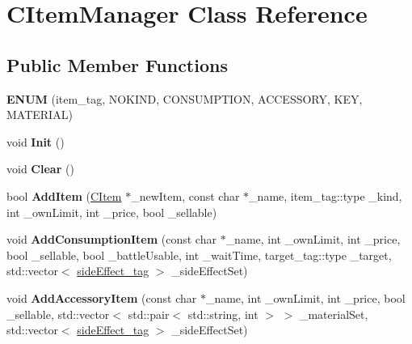 \hypertarget{class_c_item_manager}{}\section{C\+Item\+Manager Class Reference}
\label{class_c_item_manager}
\subsection*{Public Member Functions}
\begin{DoxyCompactItemize}
\item 
{\bfseries E\+N\+UM} (item\+\_\+tag, N\+O\+K\+I\+ND, C\+O\+N\+S\+U\+M\+P\+T\+I\+ON, A\+C\+C\+E\+S\+S\+O\+RY, K\+EY, M\+A\+T\+E\+R\+I\+AL)\hypertarget{class_c_item_manager_a5e95186104368015b674093bf9a4735a}{}\label{class_c_item_manager_a5e95186104368015b674093bf9a4735a}

\item 
void {\bfseries Init} ()\hypertarget{class_c_item_manager_a782a0f695d950a98f18d3e14ec1ac840}{}\label{class_c_item_manager_a782a0f695d950a98f18d3e14ec1ac840}

\item 
void {\bfseries Clear} ()\hypertarget{class_c_item_manager_aa20f0ea8d83f0c37395f2897b5b6a97f}{}\label{class_c_item_manager_aa20f0ea8d83f0c37395f2897b5b6a97f}

\item 
bool {\bfseries Add\+Item} (\hyperlink{class_c_item}{C\+Item} $\ast$\+\_\+new\+Item, const char $\ast$\+\_\+name, item\+\_\+tag\+::type \+\_\+kind, int \+\_\+own\+Limit, int \+\_\+price, bool \+\_\+sellable)\hypertarget{class_c_item_manager_ab09e43b1d2118f1f54a00307829df1e6}{}\label{class_c_item_manager_ab09e43b1d2118f1f54a00307829df1e6}

\item 
void {\bfseries Add\+Consumption\+Item} (const char $\ast$\+\_\+name, int \+\_\+own\+Limit, int \+\_\+price, bool \+\_\+sellable, bool \+\_\+battle\+Usable, int \+\_\+wait\+Time, target\+\_\+tag\+::type \+\_\+target, std\+::vector$<$ \hyperlink{structside_effect__tag}{side\+Effect\+\_\+tag} $>$ \+\_\+side\+Effect\+Set)\hypertarget{class_c_item_manager_a68c368c7cefc81227f317348dfbeeead}{}\label{class_c_item_manager_a68c368c7cefc81227f317348dfbeeead}

\item 
void {\bfseries Add\+Accessory\+Item} (const char $\ast$\+\_\+name, int \+\_\+own\+Limit, int \+\_\+price, bool \+\_\+sellable, std\+::vector$<$ std\+::pair$<$ std\+::string, int $>$ $>$ \+\_\+material\+Set, std\+::vector$<$ \hyperlink{structside_effect__tag}{side\+Effect\+\_\+tag} $>$ \+\_\+side\+Effect\+Set)\hypertarget{class_c_item_manager_a921bf797f85173d1a17828206b1d7773}{}\label{class_c_item_manager_a921bf797f85173d1a17828206b1d7773}


\end{DoxyCompactItemize}
